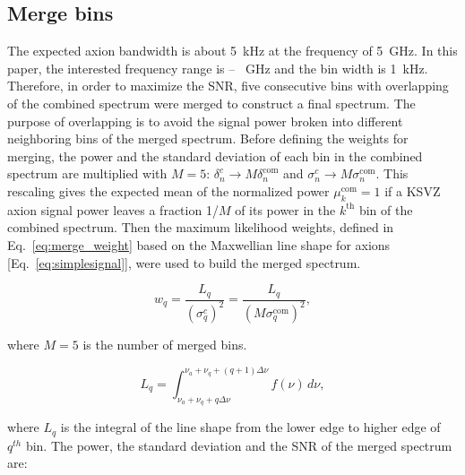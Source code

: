 \subsection{Merge bins}
\label{sec:merge}

The expected axion bandwidth is about 5~kHz at the frequency of 5~GHz. In 
this paper, the interested frequency range is \flo -- \fhi~GHz and the bin 
width is 1~kHz. Therefore, in order to maximize the SNR, five consecutive 
bins with overlapping of the combined spectrum were merged to construct a 
final spectrum.
The purpose of overlapping is to avoid the signal power broken into different 
neighboring bins of the merged spectrum. Before defining the weights for 
merging, 
the power and the standard deviation of each bin in the combined spectrum are 
multiplied with $M=5$: $\delta^{c}_n \rightarrow M\delta^\text{com}_n$ and 
$\sigma^{c}_n \rightarrow M \sigma^\text{com}_n$. This rescaling gives the 
expected mean of the normalized power $\mu^\text{com}_k = 1$ if a KSVZ axion 
signal power leaves a fraction 1/$M$ of its power in the $k^\text{th}$ 
bin of the combined spectrum.
Then the maximum likelihood weights, defined in Eq.~\eqref{eq:merge_weight} based on the Maxwellian line shape for axions [Eq.~\eqref{eq:simplesignal}], 
were used to build the merged spectrum. 



\begin{equation}
    \label{eq:merge_weight}
    w_{q} = \frac{L_{q}}{(\sigma_{q}^{c})^{2}} = \frac{L_{q}}{(M\sigma_{q}^\text{com})^{2}},
\end{equation}

where $M = 5$ is the number of merged bins.


\begin{equation}
    \label{eq:Lq_integtal}
    L_{q} = \int_{\nu_a +\nu_q + q\Delta\nu}^{\nu_a +\nu_q + (q+1)\Delta\nu} f(\nu) \,d\nu,
\end{equation}

where $L_q$ is the integral of the line shape from the lower edge to higher 
edge of ${q^{th}}$ bin. 
The power, the standard deviation and the SNR of the merged spectrum are:

